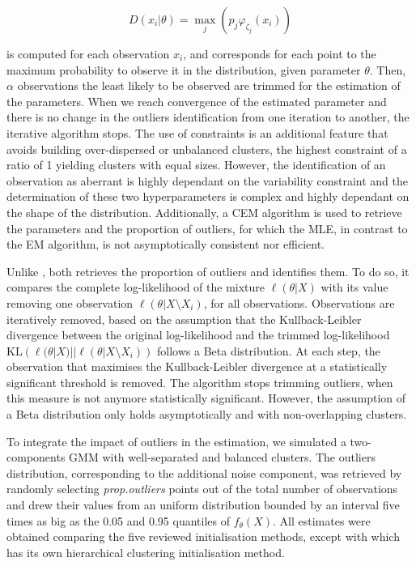 \begin{equation}
    D(x_i|\theta)=\max_j \left(p_{j} \varphi_{\zeta_j} (x_i) \right)
\label{eq:affinity-degree}
\end{equation}

is computed for each observation \(x_i\), and corresponds for each point
to the maximum probability to observe it in the distribution, given
parameter \(\theta\). Then, \(\alpha\) observations the least likely to be
observed are trimmed for the estimation of the parameters. When we reach
convergence of the estimated parameter and there is no change in the
outliers identification from one iteration to another, the iterative
algorithm stops. The use of constraints is an additional feature that
avoids building over-dispersed or unbalanced clusters, the highest
constraint of a ratio of 1 yielding clusters with equal sizes. However,
the identification of an observation as aberrant is highly dependant on
the variability constraint and the determination of these two
hyperparameters is complex and highly dependant on the shape of the
distribution. Additionally, a CEM algorithm is used to retrieve the
parameters and the proportion of outliers, for which the MLE, in
contrast to the EM algorithm, is not asymptotically consistent nor
efficient.

Unlike ,  \autocite{R-oclust} both retrieves the
proportion of outliers and identifies them. To do so, it compares the
complete log-likelihood of the mixture \(\ell(\theta|X)\) with its value
removing one observation \(\ell(\theta | X \setminus X_i)\), for all
observations. Observations are iteratively removed, based on the
assumption that the Kullback-Leibler divergence between the original
log-likelihood and the trimmed log-likelihood
\(\text{KL}\left(\ell(\theta|X)|| \ell(\theta | X \setminus X_i)\right)\)
follows a Beta distribution. At each step, the observation that
maximises the Kullback-Leibler divergence at a statistically significant
threshold is removed. The algorithm stops trimming outliers, when this
measure is not anymore statistically significant. However, the
assumption of a Beta distribution only holds asymptotically and with
non-overlapping clusters.

To integrate the impact of outliers in the estimation, we simulated a
two-components GMM with well-separated and balanced clusters. The
outliers distribution, corresponding to the additional noise component,
was retrieved by randomly selecting \emph{prop.outliers} points out of the
total number of observations and drew their values from an uniform
distribution bounded by an interval five times as big as the 0.05 and
0.95 quantiles of \(f_\theta(X)\). All estimates were obtained comparing
the five reviewed initialisation methods, except with 
which has its own hierarchical clustering initialisation method.

